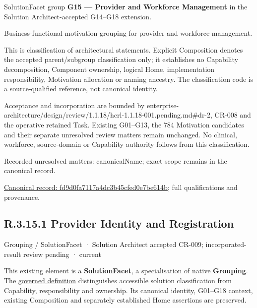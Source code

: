 SolutionFacet group \textbf{G15 — Provider and Workforce Management} in the Solution Architect-accepted G14–G18 extension.



Business-functional motivation grouping for provider and workforce management.



This is classification of architectural statements. Explicit Composition denotes the accepted parent/subgroup classification only; it establishes no Capability decomposition, Component ownership, logical Home, implementation responsibility, Motivation allocation or naming ancestry. The classification code is a source-qualified reference, not canonical identity.



Acceptance and incorporation are bounded by enterprise-architecture/design/review/1.1.18/hcrl-1.1.18-001.pending.md\#dr-2, CR-008 and the operative retained Task. Existing G01–G13, the 784 Motivation candidates and their separate unresolved review matters remain unchanged. No clinical, workforce, source-domain or Capability authority follows from this classification.


{\small Recorded unresolved matters: canonicalName; exact scope remains in the canonical record.}\par
{\footnotesize \href{../../../../../../../continuum/grouping/fd9d0fa7117a4dc3b45cfed0e7be614b.md}{Canonical record: fd9d0fa7117a4dc3b45cfed0e7be614b}; full qualifications and provenance.}\par
\subsection*{R.3.15.1 Provider Identity and Registration}
\label{navigation:R.3.15.1}

\label{element:a58e87c95bd24c16a1006b217aeac691}
{\small Grouping / SolutionFacet · Solution Architect accepted CR-009; incorporated-result review pending · current}\par

This existing element is a \textbf{SolutionFacet}, a specialisation of native
\textbf{Grouping}. The \href{\detokenize{../../../../../../../governance/continuum-representation.md#solutionfacet-classification--1119-candidate}}{governed definition}
distinguishes accessible solution classification from Capability, responsibility
and ownership. Its canonical identity, G01–G18 context, existing Composition
and separately established Home assertions are preserved.



